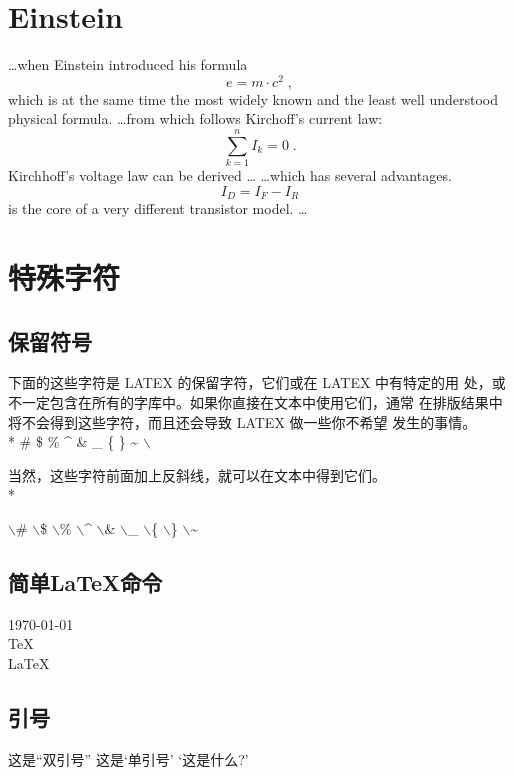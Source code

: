 \documentclass{ctexart}
\begin{document}
\section{Einstein}
\ldots when Einstein introduced his formula
\begin{equation}
  e = m \cdot c^2 \; ,
\end{equation}
which is at the same time the most widely known
and the least well understood physical formula.
\ldots from which follows Kirchoff’s current law:
\begin{equation}
  \sum_{k=1}^{n} I_k = 0 \; .
\end{equation}
Kirchhoff’s voltage law can be derived \ldots
\ldots which has several advantages.
\begin{equation}
  I_D = I_F - I_R
\end{equation}
is the core of a very different transistor model. \ldots

\section{特殊字符}
\subsection{保留符号}
下面的这些字符是 LATEX 的保留字符，它们或在 LATEX 中有特定的用
处，或不一定包含在所有的字库中。如果你直接在文本中使用它们，通常
在排版结果中将不会得到这些字符，而且还会导致 LATEX 做一些你不希望
发生的事情。 \\*
\# \qquad
\$ \qquad
\% \qquad
\^ \qquad
\& \qquad
\_ \qquad
\{ \qquad
\} \qquad
\~ \qquad
$\backslash$ 

当然，这些字符前面加上反斜线，就可以在文本中得到它们。 \\*

$\backslash$\# \qquad
$\backslash$\$ \qquad
$\backslash$\% \qquad
$\backslash$\^ \qquad
$\backslash$\& \qquad
$\backslash$\_ \qquad
$\backslash$\{ \qquad
$\backslash$\} \qquad
$\backslash$\~

\subsection{简单\LaTeX{}命令}
\today \\
\TeX \\
\LaTeX \\
\LaTeXe 

\subsection{引号}
这是``双引号'' \qquad
这是`单引号' \qquad
`这是什么?'
\end{document}
